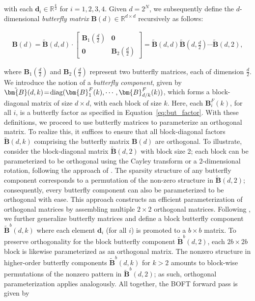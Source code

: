 with each $\bm{d}_i\in\mathbb{R}^{\frac{k}{2}}$ for $i=1,2,3,4$. Given $d=2^N$, we subsequently define the $d$-dimensional \emph{butterfly matrix} $\bm{B}(d)\in\mathbb{R}^{d\times d}$ recursively as follows:

\begin{equation}
\begin{aligned}
    \!\!\bm{B}(d)=\tilde{\bm{B}}(d,d)\!\cdot\!\begin{bmatrix}
    \bm{B}_1(\frac{d}{2})\!\!\!\!\! & \bm{0} \\
    \bm{0}\!\!\!\!\! &\bm{B}_2(\frac{d}{2})
    \end{bmatrix}= \tilde{\bm{B}}(d,d)\tilde{\bm{B}}(d,\frac{d}{2})\cdots\tilde{\bm{B}}(d,2),
\end{aligned}
\end{equation}

where $\bm{B}_1(\frac{d}{2})$ and $\bm{B}_2(\frac{d}{2})$ represent two butterfly matrices, each of dimension $\frac{d}{2}$. We introduce the notion of a \emph{butterfly component}, given by $\thickmuskip=2mu \medmuskip=2mu \tilde{\bm{B}}(d,k)=\text{diag}(\bm{B}^F_1(k),\cdots,\bm{B}^F_{d/k}(k))$, which forms a block-diagonal matrix of size $d\times d$, with each block of size $k$. Here, each $\bm{B}^F_i(k)$, for all $i$, is a butterfly factor as specified in Equation~\ref{eq:but_factor}. With these definitions, we proceed to use butterfly matrices to parameterize an orthogonal matrix. To realize this, it suffices to ensure that all block-diagonal factors $\tilde{\bm{B}}(d,k)$ comprising the butterfly matrix $\bm{B}(d)$ are orthogonal. To illustrate, consider the block-diagonal matrix $\tilde{\bm{B}}(d,2)$ with block size 2; each block can be parameterized to be orthogonal using the Cayley transform or a $2$-dimensional rotation, following the approach of \cite{liu2021orthogonal,qiu2023controlling}. The sparsity structure of any butterfly component corresponds to a permutation of the non-zero structure in $\tilde{\bm{B}}(d,2)$; consequently, every butterfly component can also be parameterized to be orthogonal with ease. This approach constructs an efficient parameterization of orthogonal matrices by assembling multiple $2\times 2$ orthogonal matrices. Following \cite{chen2022pixelated}, we further generalize butterfly matrices and define a block butterfly component $\tilde{\bm{B}}^b(d,k)$ where each element $\bm{d}_i$ (for all $i$) is promoted to a $b\times b$ matrix. To preserve orthogonality for the block butterfly component $\tilde{\bm{B}}^b(d,2)$, each $2b\times 2b$ block is likewise parameterized as an orthogonal matrix. The nonzero structure in higher-order butterfly components $\tilde{\bm{B}}^b(d,k)$ for $k>2$ amounts to block-wise permutations of the nonzero pattern in $\tilde{\bm{B}}^b(d,2)$; as such, orthogonal parameterization applies analogously. All together, the BOFT forward pass is given by

